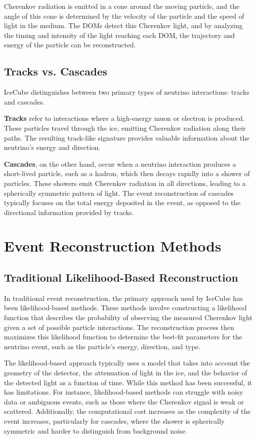 \documentclass[a4paper,12pt,numbered]{article}
\begin{document}
Cherenkov radiation is emitted in a cone around the moving particle, and the angle of this cone is determined by the velocity of the particle and the speed of light in the medium. The DOMs detect this Cherenkov light, and by analyzing the timing and intensity of the light reaching each DOM, the trajectory and energy of the particle can be reconstructed.

\subsection{Tracks vs. Cascades}
IceCube distinguishes between two primary types of neutrino interactions: tracks and cascades. 

\textbf{Tracks} refer to interactions where a high-energy muon or electron is produced. These particles travel through the ice, emitting Cherenkov radiation along their paths. The resulting track-like signature provides valuable information about the neutrino’s energy and direction.

\textbf{Cascades}, on the other hand, occur when a neutrino interaction produces a short-lived particle, such as a hadron, which then decays rapidly into a shower of particles. These showers emit Cherenkov radiation in all directions, leading to a spherically symmetric pattern of light. The event reconstruction of cascades typically focuses on the total energy deposited in the event, as opposed to the directional information provided by tracks.

\section{Event Reconstruction Methods}

\subsection{Traditional Likelihood-Based Reconstruction}
In traditional event reconstruction, the primary approach used by IceCube has been likelihood-based methods. These methods involve constructing a likelihood function that describes the probability of observing the measured Cherenkov light given a set of possible particle interactions. The reconstruction process then maximizes this likelihood function to determine the best-fit parameters for the neutrino event, such as the particle’s energy, direction, and type.

The likelihood-based approach typically uses a model that takes into account the geometry of the detector, the attenuation of light in the ice, and the behavior of the detected light as a function of time. While this method has been successful, it has limitations. For instance, likelihood-based methods can struggle with noisy data or ambiguous events, such as those where the Cherenkov signal is weak or scattered. Additionally, the computational cost increases as the complexity of the event increases, particularly for cascades, where the shower is spherically symmetric and harder to distinguish from background noise.
\end{document}
